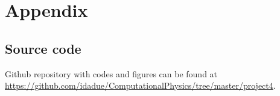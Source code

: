\documentclass[../main.tex]{subfiles}
\begin{document}
\appendix
\renewcommand{\theequation}{A\arabic{equation}}
\setcounter{equation}{0}
\section{Appendix}
\subsection{Source code}
Github repository with codes and figures can be found at \url{https://github.com/idadue/ComputationalPhysics/tree/master/project4}.
\end{document}
